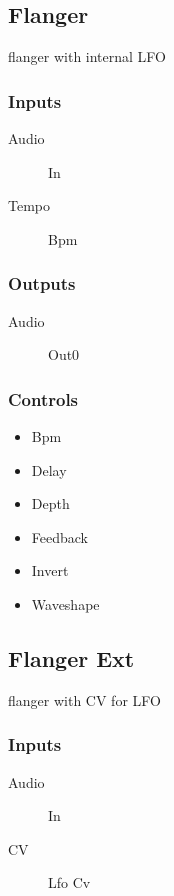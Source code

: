 \subsection{Flanger}

flanger with internal LFO



\subsubsection{Inputs}
\begin{description}
\item [Audio] In
\item [Tempo] Bpm
\end{description}

\subsubsection{Outputs}
\begin{description}
\item [Audio] Out0
\end{description}

\subsubsection{Controls}
\begin{itemize}
\item Bpm
\item Delay
\item Depth
\item Feedback
\item Invert
\item Waveshape
\end{itemize}

\subsection{Flanger Ext}

flanger with CV for LFO



\subsubsection{Inputs}
\begin{description}
\item [Audio] In
\item [CV] Lfo Cv
\end{description}

